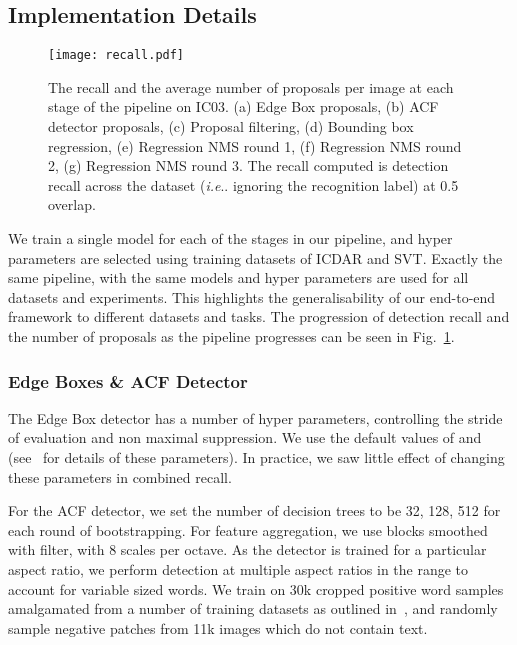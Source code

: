 \documentclass[twocolumn]{svjour3}          \smartqed  \usepackage{epsfig}
\makeatletter
\DeclareRobustCommand\onedot{\futurelet\@let@token\@onedot}
\def\@onedot{\ifx\@let@token.\else.\null\fi\xspace}
\def\ie{\emph{i.e}\onedot} \def\Ie{\emph{I.e}\onedot}
\makeatother
\begin{document}
\subsection{Implementation Details}
\label{sec:implementation}

\begin{figure}
\begin{center}
\texttt{[image: recall.pdf]} 
\caption{The recall and the average number of proposals per image at each stage of the pipeline on IC03. (a) Edge Box proposals, (b) ACF detector proposals, (c) Proposal filtering, (d) Bounding box regression, (e) Regression NMS round 1, (f) Regression NMS round 2, (g) Regression NMS round 3. The recall computed is detection recall across the dataset (\ie ignoring the recognition label) at 0.5 overlap.}
\label{fig:recall}
\end{center}
\end{figure}

We train a single model for each of the stages in our pipeline, and hyper parameters are selected using training datasets of ICDAR and SVT. Exactly the same pipeline, with the same models and hyper parameters are used for all datasets and experiments. This highlights the generalisability of our end-to-end framework to different datasets and tasks. The progression of detection recall and the number of proposals as the pipeline progresses can be seen in Fig.~\ref{fig:recall}.

\subsubsection{Edge Boxes \& ACF Detector}

The Edge Box detector has a number of hyper parameters, controlling the stride of evaluation and non maximal suppression. We use the default values of  and  (see~\cite{Zitnick14} for details of these parameters). In practice, we saw little effect of changing these parameters in combined recall.

For the ACF detector, we set the number of decision trees to be 32, 128, 512 for each round of bootstrapping. For feature aggregation, we use  blocks smoothed with  filter, with 8 scales per octave. As the detector is trained for a particular aspect ratio, we perform detection at multiple aspect ratios in the range  to account for variable sized words. We train on 30k cropped  positive word samples amalgamated from a number of training datasets as outlined in~\cite{Jaderberg14a}, and randomly sample negative patches from 11k images which do not contain text.
\end{document}
